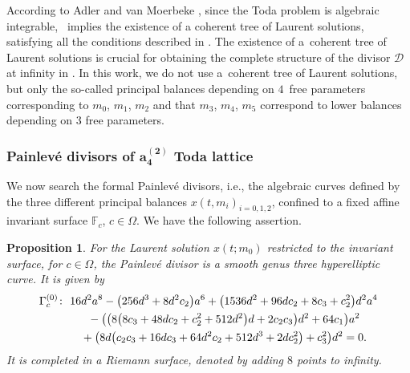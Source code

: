 \documentclass[10pt,a4paper]{amsart}
\numberwithin{equation}{section}
\newtheorem{Proposition}[Theorem]{Proposition}
 { \theoremstyle{definition}
\newtheorem{Definition}[Theorem]{Definition}
\newtheorem{Note}[Theorem]{Note}
\newtheorem{Example}[Theorem]{Example}
\newtheorem{Remark}[Theorem]{Remark} }
\begin{document}
According to Adler and van Moerbeke \cite{al_Moer4}, since the Toda
problem is algebraic integrable, \cite[Theorem~1]{al_Moer2}~implies the existence of a coherent tree of Laurent solutions,
satisfying all the conditions described in \cite{al_Moer3}. The
existence of a~coherent tree of Laurent solutions is crucial for
obtaining the complete structure of the divisor $\mathcal{D}$ at
infinity in \cite{al_Moer4}. In this work, we do not use a~coherent
tree of Laurent solutions, but only the so-called principal balances
depending on $4$~free parameters corresponding to $m_0$, $m_1$, $m_2$
and that $m_3$, $m_4$, $m_5$ correspond to lower balances depending on
$3$ free parameters.

\subsubsection[Painlev\'e divisors of a\_4\^{}(2) Toda lattice]{Painlev\'e divisors of $\boldsymbol{a_4^{(2)}}$ Toda lattice}

We now search the formal Painlev\'e divisors, i.e., the algebraic
curves defined by the three different principal balances
$x(t,m_i)_{i=0,1,2}$, confined to a fixed affine invariant surface
$\mathbb{F}_c$, $c \in \Omega$. We have the following assertion.

\begin{Proposition}\label{proposition3.4}
For the Laurent solution $x(t;m_0)$ restricted to the
invariant surface, for $c \in \Omega$, the Painlev\'e divisor
 is a smooth genus three hyperelliptic
curve. It is given by
\begin{gather*}
 \Gamma_c^{(0)}\colon \ 16d^2a^8-\bigl(256d^3+8d^2c_2\bigr)a^6+ \bigl(1536d^2+96dc_2+8c_3+c_2^2\bigr)d^2a^4 \\
 \hphantom{\Gamma_c^{(0)}\colon} \ {}-\bigl(\bigl(8\bigl(8c_3+48dc_2+c_2^2+512d^2\bigr)d+2c_2c_3\bigr)d^2+64c_1\bigr)a^2 \\
 \hphantom{\Gamma_c^{(0)}\colon} \ {} +\bigl(8d\bigl(c_2c_3+16dc_3+64d^2c_2 +512d^3+2dc_2^2\bigr)+c_3^2\bigr)d^2=0.
\end{gather*}
It is completed in a Riemann surface, denoted
 by adding $8$ points to
infinity.
\end{Proposition}
\end{document}
